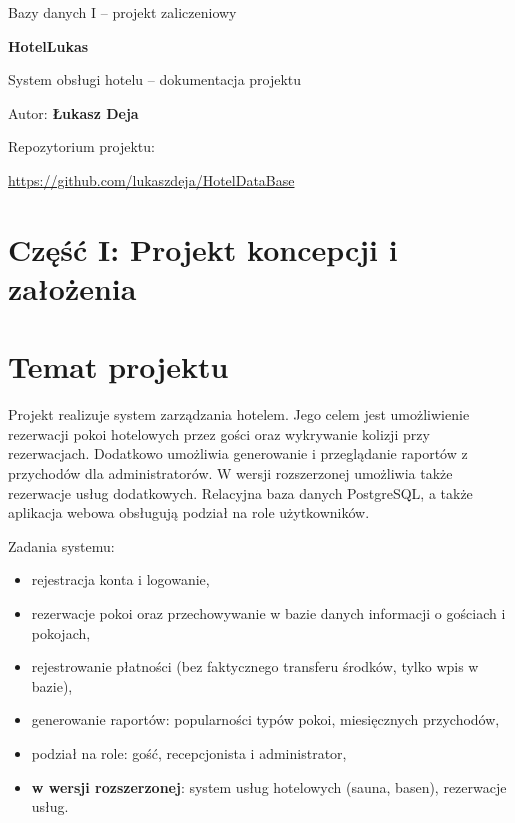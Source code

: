 \documentclass[12pt,a4paper]{article}
\begin{document}
\begin{titlepage}
  \centering
  \vspace*{\fill}

  {\Large Bazy danych I -- projekt zaliczeniowy\par}
  \vspace{0.8cm}
  {\Huge\bfseries HotelLukas\par}
  \vspace{0.5cm}
  {\large System obsługi hotelu -- dokumentacja projektu\par}

  \vspace{2.5cm}

  {\large Autor: \textbf{Łukasz Deja}\par}

  \vspace{1cm}

  {\normalsize Repozytorium projektu:\par}
  \vspace{0.2cm}
  {\normalsize\url{https://github.com/lukaszdeja/HotelDataBase}\par}

  \vspace*{\fill}
\end{titlepage}
\tableofcontents
\newpage

\section*{Część I: Projekt koncepcji i założenia}

\section{Temat projektu}

\noindent Projekt realizuje system zarządzania hotelem. Jego celem jest umożliwienie rezerwacji pokoi hotelowych przez gości oraz wykrywanie kolizji przy rezerwacjach. Dodatkowo umożliwia generowanie i przeglądanie raportów z przychodów dla administratorów. W wersji rozszerzonej umożliwia także rezerwacje usług dodatkowych. Relacyjna baza danych PostgreSQL, a także aplikacja webowa obsługują podział na role użytkowników.

Zadania systemu:
\begin{itemize}
    \item rejestracja konta i logowanie,
    \item rezerwacje pokoi oraz przechowywanie w bazie danych informacji o gościach i pokojach,
    \item rejestrowanie płatności (bez faktycznego transferu środków, tylko wpis w bazie),
    \item generowanie raportów: popularności typów pokoi, miesięcznych przychodów,
    \item podział na role: gość, recepcjonista i administrator,
    \item \textbf{w wersji rozszerzonej}: system usług hotelowych (sauna, basen), rezerwacje usług.
\end{itemize}
\end{document}
